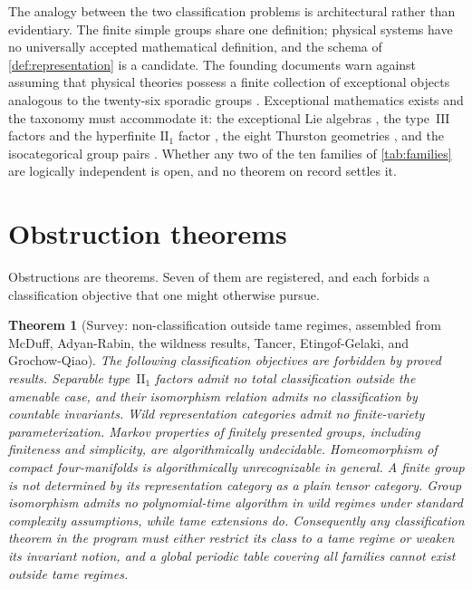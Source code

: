 \documentclass[11pt,letterpaper]{article}
\newtheorem{theorem}{Theorem}[section]
\theoremstyle{definition}
\begin{document}
The analogy between the two classification problems is architectural rather than evidentiary. The finite simple groups share one definition; physical systems have no universally accepted mathematical definition, and the schema of \cref{def:representation} is a candidate. The founding documents warn against assuming that physical theories possess a finite collection of exceptional objects analogous to the twenty-six sporadic groups \cite{corpus-1}. Exceptional mathematics exists and the taxonomy must accommodate it: the exceptional Lie algebras \cite{corpus-4}, the type~$\mathrm{III}$ factors and the hyperfinite $\mathrm{II}_1$ factor \cite{corpus-8}, the eight Thurston geometries \cite{corpus-60}, and the isocategorical group pairs \cite{corpus-12}. Whether any two of the ten families of \cref{tab:families} are logically independent is open, and no theorem on record settles it.

\section{Obstruction theorems}
\label{sec:obstructions}

Obstructions are theorems. Seven of them are registered, and each forbids a classification objective that one might otherwise pursue.

\begin{theorem}[Survey: non-classification outside tame regimes, assembled from McDuff, Adyan-Rabin, the wildness results, Tancer, Etingof-Gelaki, and Grochow-Qiao]
\label{thm:obstructions}
The following classification objectives are forbidden by proved results. Separable type~$\mathrm{II}_1$ factors admit no total classification outside the amenable case, and their isomorphism relation admits no classification by countable invariants. Wild representation categories admit no finite-variety parameterization. Markov properties of finitely presented groups, including finiteness and simplicity, are algorithmically undecidable. Homeomorphism of compact four-manifolds is algorithmically unrecognizable in general. A finite group is not determined by its representation category as a plain tensor category. Group isomorphism admits no polynomial-time algorithm in wild regimes under standard complexity assumptions, while tame extensions do. Consequently any classification theorem in the program must either restrict its class to a tame regime or weaken its invariant notion, and a global periodic table covering all families cannot exist outside tame regimes.
\end{theorem}
\end{document}
